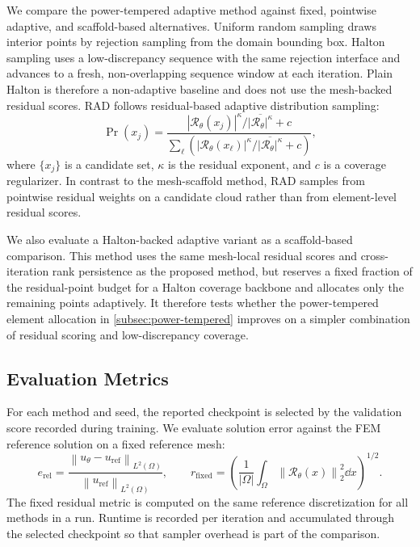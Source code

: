 We compare the power-tempered adaptive method against fixed, pointwise
adaptive, and scaffold-based alternatives.  Uniform random sampling draws
interior points by rejection sampling from the domain bounding box.  Halton
sampling uses a low-discrepancy sequence with the same rejection interface and
advances to a fresh, non-overlapping sequence window at each iteration.  Plain
Halton is therefore a non-adaptive baseline and does not use the mesh-backed
residual scores.  RAD follows residual-based adaptive distribution sampling:
\begin{equation}
    \Pr(x_j)
    =
    \frac{
        |\mathcal{R}_{\theta}(x_j)|^\kappa/
        \overline{|\mathcal{R}_{\theta}|^\kappa}
        + c
    }{
        \sum_{\ell}
        \left(
        |\mathcal{R}_{\theta}(x_\ell)|^\kappa/
        \overline{|\mathcal{R}_{\theta}|^\kappa}
        + c
        \right)
    },
    \label{eq:rad-weighting}
\end{equation}
where $\{x_j\}$ is a candidate set, $\kappa$ is the residual exponent,
and $c$ is a coverage regularizer.  In contrast to the mesh-scaffold method,
RAD samples from pointwise residual weights on a candidate cloud rather than
from element-level residual scores.

We also evaluate a Halton-backed adaptive variant as a scaffold-based
comparison.  This method uses the same mesh-local residual scores and
cross-iteration rank persistence as the proposed method, but reserves a fixed
fraction of the residual-point budget for a Halton coverage backbone and
allocates only the remaining points adaptively.  It therefore tests whether the
power-tempered element allocation in \cref{subsec:power-tempered} improves on a
simpler combination of residual scoring and low-discrepancy coverage.

\subsection{Evaluation Metrics}
\label{subsec:evaluation-metrics}

For each method and seed, the reported checkpoint is selected by the validation
score recorded during training.  We evaluate solution error against the FEM
reference solution on a fixed reference mesh:
\begin{equation}
    e_{\mathrm{rel}}
    =
    \frac{
        \left\|u_\theta-u_{\mathrm{ref}}\right\|_{L^2(\Omega)}
    }{
        \left\|u_{\mathrm{ref}}\right\|_{L^2(\Omega)}
    },
    \qquad
    r_{\mathrm{fixed}}
    =
    \left(
        \frac{1}{|\Omega|}
        \int_{\Omega}
        \left\|\mathcal{R}_{\theta}(x)\right\|_2^2
        \dd x
    \right)^{1/2}.
    \label{eq:evaluation-metrics}
\end{equation}
The fixed residual metric is computed on the same reference discretization for
all methods in a run.  Runtime is recorded per iteration and accumulated through
the selected checkpoint so that sampler overhead is part of the comparison.
